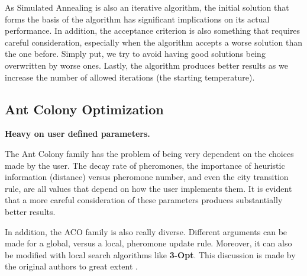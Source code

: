 As Simulated Annealing is also an iterative algorithm, the initial solution that forms the basis of the algorithm has significant implications on its actual performance. In addition, the acceptance criterion is also something that requires careful consideration, especially when the algorithm accepts a worse solution than the one before. Simply put, we try to avoid having good solutions being overwritten by worse ones. Lastly, the algorithm produces better results as we increase the number of allowed iterations (the starting temperature).

\subsection{Ant Colony Optimization}
\textbf{Heavy on user defined parameters.}

The Ant Colony family has the problem of being very dependent on the choices made by the user. The decay rate of pheromones, the importance of heuristic information (distance) versus pheromone number, and even the city transition rule, are all values that depend on how the user implements them. It is evident that a more careful consideration of these parameters produces substantially better results.

In addition, the ACO family is also really diverse. Different arguments can be made for a global, versus a local, pheromone update rule. Moreover, it can also be modified with local search algorithms like \textbf{3-Opt}. This discussion is made by the original authors to great extent \cite{dorigo1997ant}.

